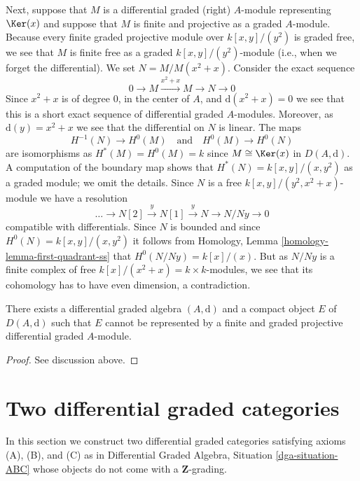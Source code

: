 \medskip\noindent
Next, suppose that $M$ is a differential graded (right) $A$-module
representing $\Ker(x)$ and suppose that $M$ is finite and
projective as a graded $A$-module. Because every finite graded projective
module over $k[x, y]/(y^2)$ is graded free, we see that $M$ is
finite free as a graded $k[x, y]/(y^2)$-module (i.e., when we forget
the differential). We set $N = M/M(x^2 + x)$.
Consider the exact sequence
$$
0 \to M \xrightarrow{x^2 + x} M \to N \to 0
$$
Since $x^2 + x$ is of degree $0$, in the center of $A$, and
$\text{d}(x^2 + x) = 0$ we see that this is a short exact sequence
of differential graded $A$-modules. Moreover, as $\text{d}(y) = x^2 + x$
we see that the differential on $N$ is linear. The maps
$$
H^{-1}(N) \to H^0(M)
\quad\text{and}\quad
H^0(M) \to H^0(N)
$$
are isomorphisms as $H^*(M) = H^0(M) = k$ since $M \cong \Ker(x)$
in $D(A, \text{d})$. A computation of the boundary map shows that
$H^*(N) = k[x, y]/(x, y^2)$ as a graded module; we omit
the details. Since $N$ is a free $k[x, y]/(y^2, x^2 + x)$-module
we have a resolution
$$
\ldots \to N[2] \xrightarrow{y} N[1] \xrightarrow{y} N \to N/Ny \to 0
$$
compatible with differentials. Since $N$ is bounded and since
$H^0(N) = k[x,y]/(x, y^2)$ it follows from
Homology, Lemma \ref{homology-lemma-first-quadrant-ss}
that $H^0(N/Ny) = k[x]/(x)$. But as $N/Ny$ is a finite complex of free
$k[x]/(x^2 + x) = k \times k$-modules, we see that its cohomology
has to have even dimension, a contradiction.

\begin{lemma}
\label{lemma-no-good-representatif-compact-object}
There exists a differential graded algebra $(A, \text{d})$ and
a compact object $E$ of $D(A, \text{d})$ such that $E$ cannot
be represented by a finite and graded projective differential
graded $A$-module.
\end{lemma}

\begin{proof}
See discussion above.
\end{proof}







\section{Two differential graded categories}
\label{section-nongraded-differential-graded}

\noindent
In this section we construct two differential graded categories satisfying
axioms (A), (B), and (C) as in
Differential Graded Algebra, Situation \ref{dga-situation-ABC}
whose objects do not come with a $\mathbf{Z}$-grading.

